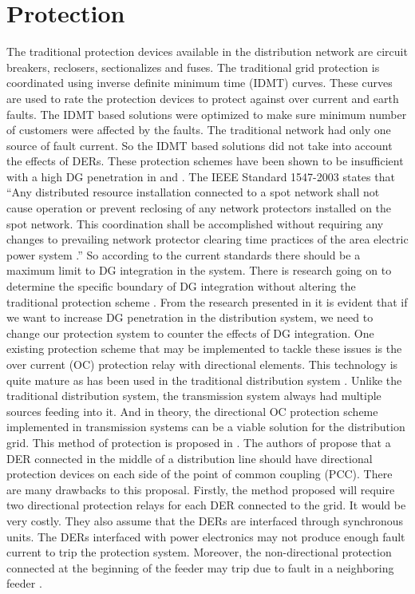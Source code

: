 \section{Protection}
The traditional protection devices available in the distribution network are circuit breakers, reclosers, sectionalizes and fuses. The traditional grid protection is coordinated using inverse definite minimum time (IDMT) curves. These curves are used to rate the protection devices to protect against over current and earth faults. The IDMT based solutions were optimized to make sure minimum number of customers were affected by the faults. The traditional network had only one source of fault current. So the IDMT based solutions did not take into account the effects of DERs. These protection schemes have been shown to be insufficient with a high DG penetration in \cite{PR133} and \cite{PR134}. The IEEE Standard 1547-2003 states that
“Any distributed resource installation connected to a spot network shall not cause operation or prevent reclosing of any network protectors installed on the spot network. This coordination shall be accomplished without requiring any changes to prevailing network protector clearing time practices of the area electric power system \cite{PR135}.” 
So according to the current standards there should be a maximum limit to DG integration in the system. There is research going on to determine the specific boundary of DG integration without altering the traditional protection scheme \cite{PR136}. 
From the research presented in \cite{PR137} it is evident that if we want to increase DG penetration in the distribution system, we need to change our protection system to counter the effects of DG integration. One existing protection scheme that may be implemented to tackle these issues is the over current (OC) protection relay with directional elements. This technology is quite mature as has been used in the traditional distribution system \cite{PR137}. Unlike the traditional distribution system, the transmission system always had multiple sources feeding into it. And in theory, the directional OC protection scheme implemented in transmission systems can be a viable solution for the distribution grid. This method of protection is proposed in \cite{PR138}. The authors of  \cite{PR138} propose that  a DER connected in the middle of a distribution line should have directional protection devices on each side of the point of common coupling (PCC). There are many drawbacks to this proposal. Firstly, the method proposed will require two directional protection relays for each DER connected to the grid. It would be very costly. They also assume that the DERs are interfaced through synchronous units. The DERs interfaced with power electronics may not produce enough fault current to trip the protection system.  Moreover, the non-directional protection connected at the beginning of the feeder may trip due to fault in a neighboring feeder  \cite{PR137}.
